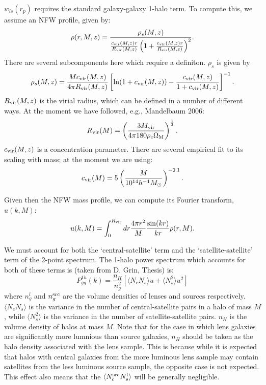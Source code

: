 \documentclass[onecolumn,amsmath,aps,fleqn, superscriptaddress]{revtex4}
\begin{document}
$w_{ls}(r_p)$ requires the standard galaxy-galaxy 1-halo term. To compute this, we assume an NFW profile, given by:
\begin{equation}
\rho(r, M, z) = \frac{\rho_s(M,z)}{\frac{c_{\rm vir}(M,z)r}{R_{\rm vir}(M,z)}\left(1+\frac{c_{\rm vir}(M,z)r}{R_{\rm vir}(M,z)}\right)^2}.
\label{nfw}
\end{equation}
There are several subcomponents here which require a definiton. $\rho_s$ is given by
\begin{equation}
\rho_s(M,z) = \frac{Mc_{\rm vir}(M,z)}{4 \pi R_{\rm vir}(M,z)}\left[{\rm ln} (1+ c_{\rm vir}(M,z)) - \frac{c_{\rm vir}(M,z)}{1+c_{\rm vir}(M,z)}\right]^{-1}.
\label{rhos}
\end{equation}
$R_{\rm vir}(M,z)$ is the virial radius, which can be defined in a number of different ways. At the moment we have followed, e.g., Mandelbaum 2006:
\begin{equation}
R_{\rm vir}(M) = \left(\frac{3 M_{\rm vir}}{4 \pi 180 \rho_c \Omega_{\rm M}} \right)^{\frac{1}{3}}.
\label{Rvir}
\end{equation}
$c_{\rm vir}(M,z)$ is a concentration parameter. There are several empirical fit to its scaling with mass; at the moment we are using:
\begin{equation}
c_{\rm vir}(M) = 5\left(\frac{M}{10^{14}h^{-1}M_{\odot}}\right)^{-0.1}.
\label{cvir}
\end{equation}

Given then the NFW mass profile, we can compute its Fourier transform, $u(k, M)$:
\begin{equation}
u(k, M) = \int_0^{R_{\rm vir}} dr \frac{4 \pi r^2}{M}\frac{\sin(kr)}{kr}\rho(r, M).
\label{u}
\end{equation}

We must account for both the `central-satellite' term and the `satellite-satellite' term of the 2-point spectrum. The 1-halo power spectrum which accounts for both of these terms is (taken from D. Grin, Thesis) is:
\begin{equation}
P_{gg}^{1h}(k) = \frac{n_H}{n_g^2}\left[\langle N_c N_s \rangle u + \langle N_s^2 \rangle u^2\right]
\label{1hpgg}
\end{equation}
where $n_g^l$ and $n_g^{\rm src}$ are the volume densities of lenses and sources respectively. $\langle N_c N_s \rangle$ is the variance in the number of central-satellite pairs in a halo of mass $M$, while $\langle N_s^2 \rangle$ is the variance in the number of satellite-satellite pairs. $n_H$ is the volume density of halos at mass $M$. Note that for the case in which lens galaxies are significantly more lumnious than source galaxies, $n_H$ should be taken as the halo density associated with the lens sample. This is because while it is expected that halos with central galaxies from the more luminous lens sample may contain satellites from the less luminous source sample, the opposite case is not expected. This effect also means that the $\langle N_c^{\rm src} N_s^{\rm l} \rangle$ will be generally negligible.
\end{document}
